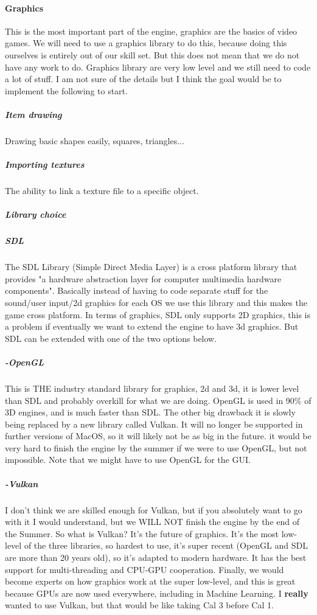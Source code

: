 \documentclass{article}
\begin{document}
	\paragraph{Graphics}
	This is the most important part of the engine, graphics are the basics of video games. We will need to use a graphics library to do this, because doing this ourselves is entirely out of our skill set. But this does not mean that we do not have any work to do. Graphics library are very low level and we still need to code a lot of stuff. I am not sure of the details but I think the goal would be to implement the following to start.
	\subparagraph{Item drawing}
	Drawing basic shapes easily, squares, triangles...
	\subparagraph{Importing textures}
	The ability to link a texture file to a specific object.
	\subparagraph{Library choice}
	\subparagraph{SDL}
	The SDL Library (Simple Direct Media Layer) is a cross platform library that provides "a hardware abstraction layer for computer multimedia hardware components". Basically instead of having to code separate stuff for the sound/user input/2d graphics for each OS we use this library and this makes the game cross platform. In terms of graphics, SDL only supports 2D graphics, this is a problem if eventually we want to extend the engine to have 3d graphics. But SDL can be extended with one of the two options below.
	\subparagraph{-OpenGL}
	This is THE industry standard library for graphics, 2d and 3d, it is lower level than SDL and probably overkill for what we are doing. OpenGL is used in 90\% of 3D engines, and is much faster than SDL. The other big drawback it is slowly being replaced by a new library called Vulkan. It will no longer be supported in further versions of MacOS, so it will likely not be as big in the future. it would be very hard to finish the engine by the summer if we were to use OpenGL, but not impossible. Note that we might have to use OpenGL for the GUI.
	\subparagraph{-Vulkan}
	I don't think we are skilled enough for Vulkan, but if you absolutely want to go with it I would understand, but we WILL NOT finish the engine by the end of the Summer. So what is Vulkan? It's the future of graphics. It's the most low-level of the three libraries, so hardest to use, it's super recent (OpenGL and SDL are more than 20 years old), so it's adapted to modern hardware. It has the best support for multi-threading and CPU-GPU cooperation. Finally, we would become experts on how graphics work at the super low-level, and this is great because GPUs are now used everywhere, including in Machine Learning. I \textbf{really} wanted to use Vulkan, but that would be like taking Cal 3 before Cal 1.
\end{document}

